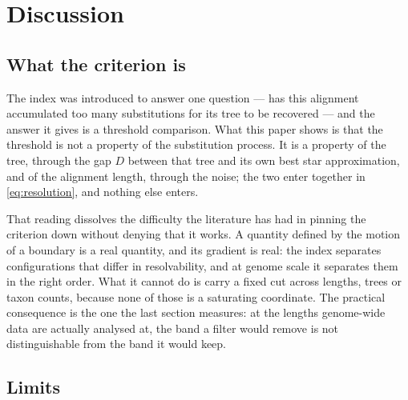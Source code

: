 \documentclass[preprint,12pt,authoryear]{elsarticle}
\theoremstyle{definition}
\theoremstyle{remark}
\begin{document}

\section{Discussion}
\label{sec:discussion}

\subsection{What the criterion is}

The index was introduced to answer one question --- has this alignment
accumulated too many substitutions for its tree to be recovered --- and the
answer it gives is a threshold comparison. What this paper shows is that the
threshold is not a property of the substitution process. It is a property of
the tree, through the gap $D$ between that tree and its own best star
approximation, and of the alignment length, through the noise; the two enter
together in \eqref{eq:resolution}, and nothing else enters.

That reading dissolves the difficulty the literature has had in pinning the
criterion down without denying that it works. A quantity defined by the
motion of a boundary is a real quantity, and its gradient is real: the index
separates configurations that differ in resolvability, and at genome scale it
separates them in the right order. What it cannot do is carry a fixed cut
across lengths, trees or taxon counts, because none of those is a
saturating coordinate. The practical consequence is the one the last section
measures: at the lengths genome-wide data are actually analysed at, the band
a filter would remove is not distinguishable from the band it would keep.

\subsection{Limits}
\end{document}
